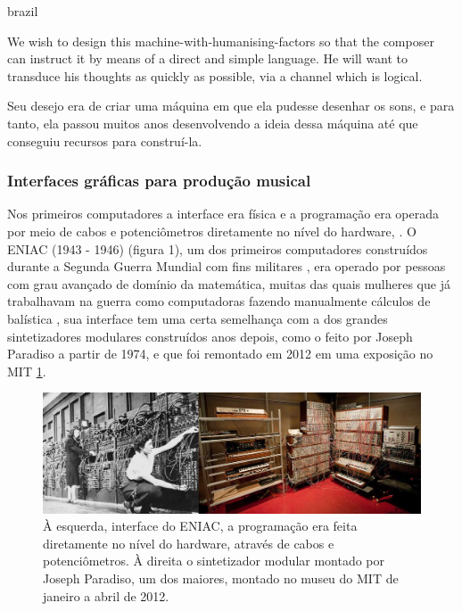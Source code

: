 \begin{otherlanguage*}{brazil}
\begin{citacao}
We wish to design this machine-with-humanising-factors so that the composer can instruct it by means of a direct and simple language. He will want to transduce his thoughts as quickly as possible, via a channel which is logical. \cite[97]{Oram1972}
\end{citacao}

Seu desejo era de criar uma máquina em que ela pudesse desenhar os sons, e para tanto, ela passou muitos anos desenvolvendo a ideia dessa máquina até que conseguiu recursos para construí-la. 





\subsubsection{Interfaces gráficas para produção musical}

Nos primeiros computadores a interface era física e a programação era operada por meio de cabos e potenciômetros diretamente no nível do hardware, \cite[110]{Henrique1996}. O ENIAC (1943 - 1946) (figura 1), um dos primeiros computadores construídos durante a Segunda Guerra Mundial com fins militares \cite[24]{Stolfi}, era operado por pessoas com grau avançado de domínio da matemática, muitas das quais mulheres que já trabalhavam na guerra como computadoras fazendo manualmente cálculos de balística \cite{HayleyWilliams2015}, sua interface tem uma certa semelhança com a dos grandes sintetizadores modulares construídos anos depois, como o feito por Joseph Paradiso a partir de 1974, e que foi remontado em 2012 em uma exposição no MIT \ref{analogicos}. 

\begin{figure}[ht]
    \caption{\label{analogicos}À esquerda, interface do ENIAC, a programação era feita diretamente no nível do hardware, através de cabos e potenciômetros.  À direita o sintetizador modular montado por Joseph Paradiso, um dos maiores, montado no museu do MIT de janeiro a abril de 2012.}
    \begin{center}
        \includegraphics[width=1\linewidth]{pictures/analogicos}
    \end{center}
\end{figure}


\end{otherlanguage*}
